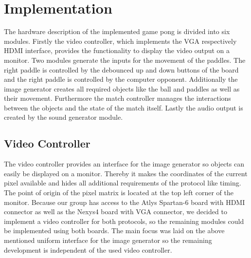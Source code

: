 \section{Implementation}
The hardware description of the implemented game pong is divided into six modules. Firstly the video controller, which implements the VGA respectively HDMI interface, provides the functionality to display the video output on a monitor. Two modules generate the inputs for the movement of the paddles. The right paddle is controlled by the debounced up and down buttons of the board and the right paddle is controlled by the computer opponent. Additionally the image generator creates all required objects like the ball and paddles as well as their movement. Furthermore the match controller manages the interactions between the objects and the state of the match itself. Lastly the audio output is created by the sound generator module.
	\subsection{Video Controller}
    The video controller provides an interface for the image generator so objects can easily be displayed on a monitor. Thereby it makes the coordinates of the current pixel available and hides all additional requirements of the protocol like timing. The point of origin of the pixel matrix is located at the top left corner of the monitor. Because our group has access to the Atlys Spartan-6 board with HDMI connector as well as the Nexys4 board with VGA connector, we decided to implement a video controller for both protocols, so the remaining modules could be implemented using both boards. The main focus was laid on the above mentioned uniform interface for the image generator so the remaining development is independent of the used video controller.
